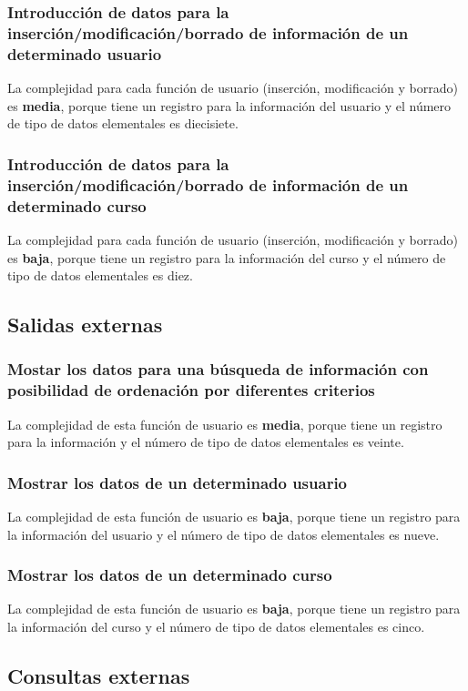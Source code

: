 \documentclass[11pt,a4paper,spanish,twoside]{book}
\begin{document}
\subsubsection{Introducción de datos para la inserción/modificación/borrado 
de información de un determinado usuario}
La complejidad para cada función de usuario (inserción, modificación y
borrado) es \textbf{media}, porque tiene un registro para la información del
usuario y el número de tipo de datos elementales es diecisiete.

\subsubsection{Introducción de datos para la inserción/modificación/borrado 
de información de un determinado curso }
La complejidad para cada función de usuario (inserción, modificación y
borrado) es \textbf{baja}, porque tiene un registro para la información del
curso y el número de tipo de datos elementales es diez.

\subsection{Salidas externas}
\subsubsection{Mostar los datos para una búsqueda de información con
posibilidad de ordenación por diferentes criterios}
La complejidad de esta función de usuario es \textbf{media}, porque tiene un
registro para la información y el número de tipo de datos elementales es veinte.

\subsubsection{Mostrar los datos de un determinado usuario}
La complejidad de esta función de usuario es \textbf{baja}, porque tiene un
registro para la información del usuario y el número de tipo de datos
elementales es nueve.

\subsubsection{Mostrar los datos de un determinado curso}
La complejidad de esta función de usuario es \textbf{baja}, porque tiene un
registro para la información del curso y el número de tipo de datos
elementales es cinco.

\subsection{Consultas externas}
\end{document}
